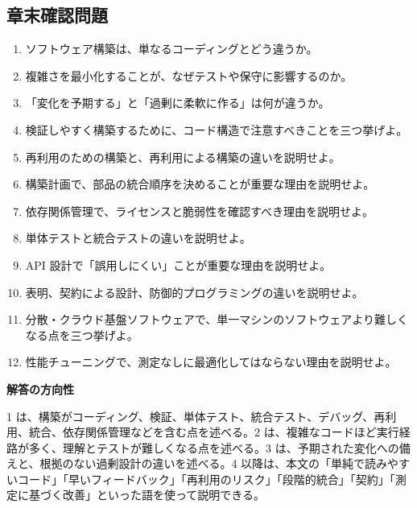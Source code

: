 \subsection{章末確認問題}

\begin{enumerate}
  \item ソフトウェア構築は、単なるコーディングとどう違うか。
  \item 複雑さを最小化することが、なぜテストや保守に影響するのか。
  \item 「変化を予期する」と「過剰に柔軟に作る」は何が違うか。
  \item 検証しやすく構築するために、コード構造で注意すべきことを三つ挙げよ。
  \item 再利用のための構築と、再利用による構築の違いを説明せよ。
  \item 構築計画で、部品の統合順序を決めることが重要な理由を説明せよ。
  \item 依存関係管理で、ライセンスと脆弱性を確認すべき理由を説明せよ。
  \item 単体テストと統合テストの違いを説明せよ。
  \item API 設計で「誤用しにくい」ことが重要な理由を説明せよ。
  \item 表明、契約による設計、防御的プログラミングの違いを説明せよ。
  \item 分散・クラウド基盤ソフトウェアで、単一マシンのソフトウェアより難しくなる点を三つ挙げよ。
  \item 性能チューニングで、測定なしに最適化してはならない理由を説明せよ。
\end{enumerate}

\begin{plainbox}
\textbf{解答の方向性}

1 は、構築がコーディング、検証、単体テスト、統合テスト、デバッグ、再利用、統合、依存関係管理などを含む点を述べる。2 は、複雑なコードほど実行経路が多く、理解とテストが難しくなる点を述べる。3 は、予期された変化への備えと、根拠のない過剰設計の違いを述べる。4 以降は、本文の「単純で読みやすいコード」「早いフィードバック」「再利用のリスク」「段階的統合」「契約」「測定に基づく改善」といった語を使って説明できる。
\end{plainbox}
